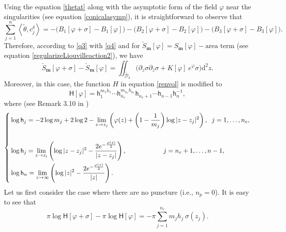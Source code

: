 \documentclass[a4paper,11pt]{article}
\newcommand{\dd}{\mathrm{d}}
\newcommand{\Lponetial}{\mathsf{h}}
\newcommand{\singfund}{\overset{{}_{\curlywedge}}{\mathcal{D}}}
\newcommand{\stks}[1]{
	 \left< #1 \right>
}
\begin{document}
Using the equation \eqref{thetat} along with the asymptotic form of the field $\varphi$ near the singularities (see equation \eqref{conicalasymp}), it is straightforward to observe that
\begin{equation}
\sum_{j=1}^{n}\stks{\tilde\theta,c_{j}^{\delta}} = - \Big(B_{1}[\varphi+\sigma]-B_{1}[\varphi]\Big)- \Big(B_{2}[\varphi+\sigma]-B_{2}[\varphi]\Big)- \Big(B_{3}[\varphi+\sigma]-B_{3}[\varphi]\Big).\label{q4}
\end{equation}
Therefore, according to \eqref{q3} with \eqref{q4} and for $\check S_{\boldsymbol{m}}[\varphi]=S_{\boldsymbol{m}}[\varphi]-\text{area term}$ (see equation \eqref{regularizeLiouvilleaction2}), we have
\begin{equation}
 \check S_{\boldsymbol{m}}[\varphi+\sigma]- \check S_{\boldsymbol{m}}[\varphi] = \iint_{\singfund_{\delta}}\Big(\partial_z \sigma\partial_{\bar{z}}\sigma +  K[\varphi] ~e^{\varphi} \sigma\Big) \dd^{2}z.\label{q5}
\end{equation}
Moreover, in this case, the function $H$ in equation \eqref{renvol} is modified to
\begin{equation}
\mathsf{H}[\varphi] = \Lponetial_{1}^{m_1h_1}\dotsm\Lponetial_{n_e}^{m_{n_e} h_{n_e}}\Lponetial_{n_e+1}\dotsm\Lponetial_{n-1}\Lponetial^{-1}_{n},\label{H2}
\end{equation}
where (see Remark 3.10 in \cite{Taghavi2024classical})
\begin{equation}
\left\{
\begin{split}
& \log \Lponetial_{j} = -2 \log m_j + 2 \log 2 - \lim_{z \to z_{j}}\left(\varphi(z) + \left(1-\frac{1}{m_j}\right) \log|z-z_{j}|^2\right), \hspace{.2cm} j=1,\dots,n_e,\\ \\
&\log \Lponetial_{j} = \lim_{z \to z_{i}} \left(\log|z-z_{j}|^2 - \frac{2 e^{-\frac{\varphi(z)}{2}}}{|z-z_{j}|}\right),\hspace{2cm}  j=n_e+1,\dots,n-1,\\
& \log \Lponetial_{n} = \lim_{z \to \infty} \left(\log|z|^2 - \frac{2 e^{-\frac{\varphi(z)}{2}}}{|z|}\right).\label{loghj}
\end{split}
\right.
\end{equation}
Let us first consider the case where there are no puncture (i.e., $n_p=0$).  It is easy to see that
\begin{equation}
\pi \log \mathsf{H}[\varphi+\sigma]-\pi \log \mathsf{H}[\varphi] = -\pi \sum_{j=1}^{n_e} m_j h_j~ \sigma(z_j).\label{q6}
\end{equation}
\end{document}
